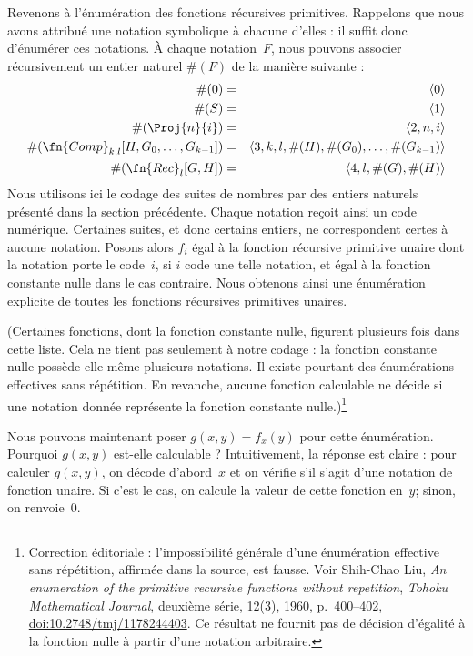 \documentclass[../../../include/open-logic-section]{subfiles}
\begin{document}
Revenons à l'énumération des fonctions récursives primitives.
Rappelons que nous avons attribué une notation symbolique à chacune
d'elles : il suffit donc d'énumérer ces notations. À chaque
notation~$F$, nous pouvons associer récursivement un entier
naturel $\#(F)$ de la manière suivante :
\begin{eqnarray*}
\#(0) & = & \langle 0 \rangle \\
\#(S) & = & \langle 1 \rangle \\
\#(\Proj{n}{i}) & = & \langle 2, n, i \rangle \\
\#(\fn{Comp}_{k,l}[H,G_0,\dots,G_{k-1}]) & = & \langle
3,k,l,\#(H),\#(G_0),\dots,\#(G_{k-1}) \rangle \\
\#(\fn{Rec}_l[G,H]) & = & \langle 4, l, \#(G), \#(H) \rangle
\end{eqnarray*}
Nous utilisons ici le codage des suites de nombres par des entiers
naturels présenté dans la section précédente. Chaque notation
reçoit ainsi un code numérique. Certaines suites, et donc certains
entiers, ne correspondent certes à aucune notation. Posons alors
$f_i$ égal à la fonction récursive primitive unaire dont la
notation porte le code~$i$, si $i$ code une telle notation, et
égal à la fonction constante nulle dans le cas contraire. Nous
obtenons ainsi une énumération explicite de toutes les fonctions
récursives primitives unaires.

(Certaines fonctions, dont la fonction constante nulle, figurent
plusieurs fois dans cette liste. Cela ne tient pas seulement à
notre codage : la fonction constante nulle possède elle-même
plusieurs notations. Il existe pourtant des énumérations effectives
sans répétition. En revanche, aucune fonction calculable
ne décide si une notation donnée représente
la fonction constante nulle.)\footnote{Correction éditoriale : l'impossibilité générale d'une énumération effective sans répétition, affirmée dans la source, est fausse. Voir Shih-Chao Liu, \emph{An enumeration of the primitive recursive functions without repetition}, \emph{Tohoku Mathematical Journal}, deuxième série, 12(3), 1960, p.~400–402, \href{https://doi.org/10.2748/tmj/1178244403}{doi:10.2748/tmj/1178244403}. Ce résultat ne fournit pas de décision d'égalité à la fonction nulle à partir d'une notation arbitraire.}

Nous pouvons maintenant poser $g(x,y)=f_x(y)$ pour cette
énumération. Pourquoi $g(x,y)$ est-elle calculable ?
Intuitivement, la réponse est claire : pour calculer $g(x,y)$,
on décode d'abord~$x$ et on vérifie s'il s'agit d'une
notation de fonction unaire. Si c'est le cas, on calcule
la valeur de cette fonction en~$y$; sinon, on renvoie~$0$.
\end{document}

